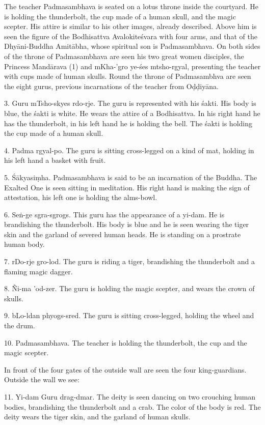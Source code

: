 \documentclass[a4paper, 12pt, oneside]{article}
\begin{document}
The teacher Padmasambhava is seated on a lotus throne inside the courtyard. He is holding the thunderbolt, the cup made of a human skull, and the magic scepter. His attire is similar to his other images, already described. Above him is seen the figure of the Bodhisattva Avalokite\'{s}vara with four arms, and that of the Dhy\={a}ni-Buddha Amit\={a}bha, whose spiritual son is Padmasambhava. On both sides of the throne of Padmasambhava are seen his two great women disciples, the Princess Mand\={a}rava (1) and mKha-'gro ye-\'{s}es mtsho-rgyal, presenting the teacher with cups made of human skulls. Round the throne of Padmasambhva are seen the eight gurus, previous incarnations of the teacher from O\d{d}\d{d}iy\={a}na.

3. Guru mTsho-skyes rdo-rje. The guru is represented with his \'{s}akti. His body is blue, the \'{s}akti is white. He wears the attire of a Bodhisattva. In his right hand he has the thunderbolt, in his left hand he is holding the bell. The \'{s}akti is holding the cup made of a human skull.

4. Padma rgyal-po. The guru is sitting cross-legged on a kind of mat, holding in his left hand a basket with fruit.

5. \'{S}\={a}kyasi\d{m}ha. Padmasambhava is said to be an incarnation of the Buddha. The Exalted One is seen sitting in meditation. His right hand is making the sign of attestation, his left one is holding the alms-bowl.

6. Se\.{n}-ge sgra-sgrogs. This guru has the appearance of a yi-dam. He is brandishing the thunderbolt. His body is blue and he is seen wearing the tiger skin and the garland of severed human heads. He is standing on a prostrate human body.

7. rDo-rje gro-lod. The guru is riding a tiger, brandishing the thunderbolt and a flaming magic dagger.

8. Ñi-ma 'od-zer. The guru is holding the magic scepter, and wears the crown of skulls.

9. bLo-ldan phyogs-sred. The guru is sitting cross-legged, holding the wheel and the drum.

10. Padmasambhava. The teacher is holding the thunderbolt, the cup and the magic scepter.

In front of the four gates of the outside wall are seen the four king-guardians. Outside the wall we see:

11. Yi-dam Guru drag-dmar. The deity is seen dancing on two crouching human bodies, brandishing the thunderbolt and a crab. The color of the body is red. The deity wears the tiger skin, and the garland of human skulls.
\end{document}

